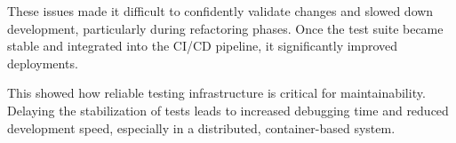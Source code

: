 These issues made it difficult to confidently validate changes and slowed down development, particularly during refactoring phases. Once the test suite became stable and integrated into the CI/CD pipeline, it significantly improved deployments.

This showed how reliable testing infrastructure is critical for maintainability. Delaying the stabilization of tests leads to increased debugging time and reduced development speed, especially in a distributed, container-based system.

